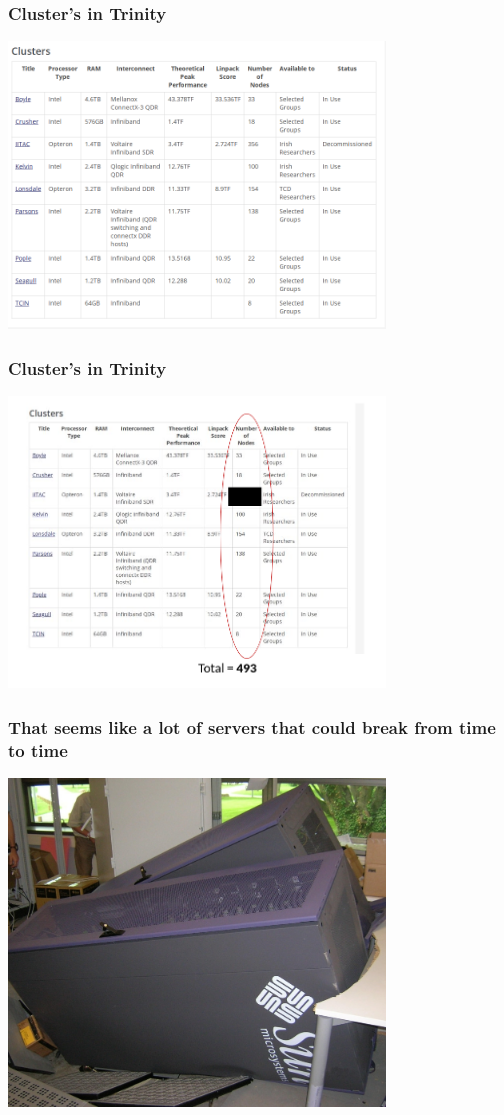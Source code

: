 \documentclass{beamer}
\begin{document}
\begin{frame}
\frametitle{Cluster's in Trinity}
\begin{center}
	\includegraphics[width=0.75\textwidth]{imgs/tchpc_clusters.png}
\end{center}
\end{frame}

\begin{frame}
\frametitle{Cluster's in Trinity}
\begin{center}
	\includegraphics[width=0.75\textwidth]{imgs/tchpc_clusters2.png}
\end{center}
\end{frame}

\begin{frame}
\frametitle{That seems like a lot of servers that could break from time to time}
\begin{center}
	\includegraphics[width=0.75\textwidth]{imgs/fallen_rack.jpg}
\end{center}
\end{frame}
\end{document}

